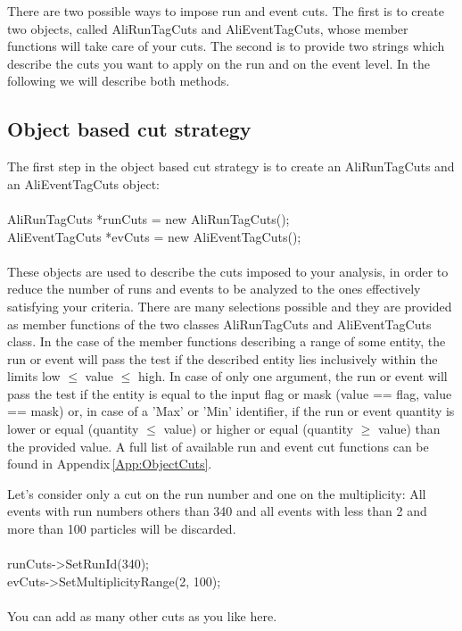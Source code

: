 There are two possible ways to impose run and event cuts. The first is to create two objects, called {\ttfamily AliRunTagCuts} and {\ttfamily AliEventTagCuts}, whose member functions will take care of your cuts. The second is to provide two strings which describe the cuts you want to apply on the run and on the event level. In the following we will describe both methods.


\subsection{Object based cut strategy}
The first step in the object based cut strategy is to create an {\ttfamily AliRunTagCuts} and an {\ttfamily AliEventTagCuts} object:\\
\\
{\ttfamily AliRunTagCuts *runCuts = new AliRunTagCuts();}\\
{\ttfamily AliEventTagCuts *evCuts = new AliEventTagCuts();}\\
\\
These objects are used to describe the cuts imposed to your analysis, in order to reduce the number of runs and events to be analyzed to the ones effectively satisfying your criteria. There are many selections possible and they are provided as member functions of the two classes {\ttfamily AliRunTagCuts} and {\ttfamily AliEventTagCuts} class. In the case of the member functions describing a range of some entity, the run or event will pass the test if the described entity lies inclusively within the limits {\ttfamily low $\le$ value $\le$ high}. In case of only one argument, the run or event will pass the test if the entity is equal to the input flag or mask ({\ttfamily value == flag}, {\ttfamily value == mask}) or, in case of a 'Max' or 'Min' identifier, if the run or event quantity is lower or equal ({\ttfamily quantity $\le$ value}) or higher or equal ({\ttfamily quantity $\ge$ value}) than the provided value. A full list of available run and event cut functions can be found in Appendix\,\ref{App:ObjectCuts}.

Let's consider only a cut on the run number and one on the multiplicity: All events with run numbers others than 340 and all events with less than 2 and more than 100 particles will be discarded.\\
\\
{\ttfamily runCuts->SetRunId(340);}\\
{\ttfamily evCuts->SetMultiplicityRange(2, 100);}\\
\\
You can add as many other cuts as you like here.

